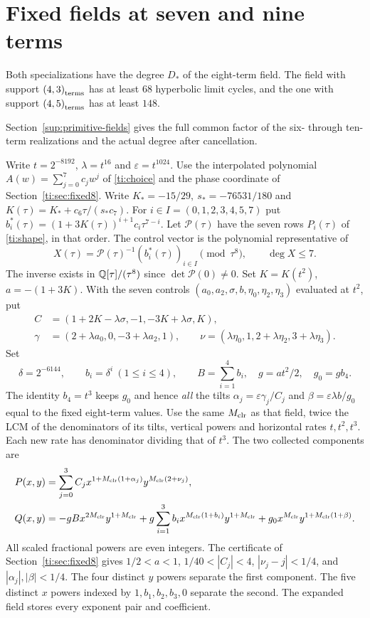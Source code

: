 \section{Fixed fields at seven and nine terms}\label{cv:fixed79}
\begin{theorem}\label{cv:nine}Both specializations have the degree \(D_*\) of the eight-term field. The field with support \(\left(4,3\right)_{\mathrm{terms}}\) has at least \(68\) hyperbolic limit cycles, and the one with support \(\left(4,5\right)_{\mathrm{terms}}\) has at least \(148\).\end{theorem}
Section~\ref{sup:primitive-fields} gives the full common factor of the six- through ten-term realizations and the actual degree after cancellation.

Write $t=2^{-8192}$, $\lambda=t^{16}$ and $\varepsilon=t^{1024}$. Use the interpolated polynomial \(A(w)=\sum_{j=0}^7c_jw^j\) of \eqref{ti:choice} and the phase coordinate of Section~\ref{ti:sec:fixed8}. Write \(K_*=-15/29,\ s_*=-76531/180\) and \(K(\tau)=K_*+c_6\tau/(s_*c_7)\). For \(i\in I=(0,1,2,3,4,5,7)\) put \(b_i^*(\tau)=(1+3K(\tau))^{i+1}c_i\tau^{7-i}\). Let \(\mathcal P(\tau)\) have the seven rows \(P_i(\tau)\) of \eqref{ti:shape}, in that order. The control vector is the polynomial representative of
\[
 X(\tau)=\mathcal P(\tau)^{-1}(b_i^*(\tau))_{i\in I}\pmod{\tau^8},
 \qquad \deg X\le7 .
\]
The inverse exists in \(\mathbb{Q}[\tau]/(\tau^8)\) since \(\det\mathcal P(0)\ne0\). Set \(K=K(t^2)\), \(a=-(1+3K)\). With the seven controls $(a_0,a_2,\sigma,b,\eta_0,\eta_2,\eta_3)$ evaluated at $t^2$, put
\[
\begin{split}
 C&=(1+2K-\lambda\sigma,-1,-3K+\lambda\sigma,K),\\
 \gamma&=(2+\lambda a_0,0,-3+\lambda a_2,1),\qquad
 \nu=(\lambda\eta_0,1,2+\lambda\eta_2,3+\lambda\eta_3).
\end{split}
\]
Set
\[
 \delta=2^{-6144},\qquad b_i=\delta^i\ (1\le i\le4),\qquad
 B=\sum_{i=1}^4 b_i,\quad g=at^2/2,\quad g_0=gb_4 .
\]
The identity $b_4=t^3$ keeps $g_0$ and hence \emph{all} the tilts
$\alpha_j=\varepsilon\gamma_j/C_j$ and $\beta=\varepsilon\lambda b/g_0$
equal to the fixed eight-term values. Use the same $M_{\mathrm{clr}}{}$ as that field,
twice the LCM of the denominators of its tilts, vertical powers and
horizontal rates $t,t^2,t^3$. Each new rate has denominator dividing that
of $t^3$. The two collected components are
\begin{align}
 P(x,y)&=\sum_{j=0}^3 C_j x^{1+M_{\mathrm{clr}}{}(1+\alpha_j)}y^{M_{\mathrm{clr}}{}(2+\nu_j)}, \notag\\
 Q(x,y)&=-gB x^{2M_{\mathrm{clr}}{}}y^{1+M_{\mathrm{clr}}{}}
        +g\sum_{i=1}^3 b_i x^{M_{\mathrm{clr}}{}(1+b_i)}y^{1+M_{\mathrm{clr}}{}}
        +g_0 x^{M_{\mathrm{clr}}} y^{1+M_{\mathrm{clr}}{}(1+\beta)} .                                \label{cv:field}
\end{align}
All scaled fractional powers are even integers. The certificate of Section~\ref{ti:sec:fixed8}
gives $1/2<a<1$, $1/40<|C_j|<4$, $|\nu_j-j|<1/4$, and
$|\alpha_j|,|\beta|<1/4$. The four distinct $y$ powers separate the first
component. The five distinct $x$ powers indexed by $1,b_1,b_2,b_3,0$
separate the second. The expanded field stores every
exponent pair and coefficient.

